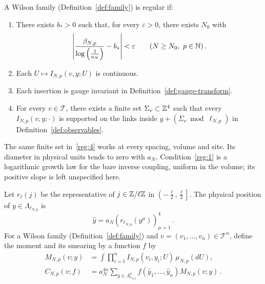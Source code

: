 \begin{definition}[Regularity]\label{def:regular}
A Wilson family (Definition~\ref{def:family}) is regular if:
\begin{enumerate}[label=\textup{Reg\arabic*.},ref=Reg\arabic*]
\item\label{reg:1} There exists $b_*>0$ such that, for every $\varepsilon>0$, there exists $N_0$ with
\begin{equation}\label{eq:running}
\left|\frac{\beta_{N,p}}{\log\left(\frac{1}{a_N}\right)}-b_*\right|<\varepsilon
\qquad(N\ge N_0,\ p\in\mathbb N)\,.
\end{equation}
\item\label{reg:2} Each $U\mapsto I_{N,p}(v,y;U)$ is continuous.
\item\label{reg:3} Each insertion is gauge invariant in Definition~\ref{def:gauge-transform}.
\item\label{reg:4} For every $v\in\mathcal T$, there exists a finite set $\Sigma_v\subset\mathbb Z^4$ such that every $I_{N,p}(v,y;\cdot)$ is supported on the links inside $y+(\Sigma_v\bmod\ell_{N,p})$ in Definition~\ref{def:observables}.
\end{enumerate}
\end{definition}

The same finite set in~\ref{reg:4} works at every spacing, volume and site.
Its diameter in physical units tends to zero with $a_N$.
Condition~\ref{reg:1} is a logarithmic growth law for the bare inverse coupling, uniform in the volume; its positive slope is left unspecified here.

\begin{definition}\label{def:moments}
Let $r_\ell(j)$ be the representative of $j\in\mathbb Z/\ell\mathbb Z$ in
$\left(-\frac{\ell}{2},\frac{\ell}{2}\right]$.
The physical position of $y\in\Lambda_{\ell_{N,p}}$ is
\begin{equation}\label{eq:physical-position}
\hat y=a_N(r_{\ell_{N,p}}(y^\mu))_{\mu=1}^4\,.
\end{equation}
For a Wilson family (Definition~\ref{def:family}) and $v=(v_1,\ldots,v_n)\in\mathcal T^n$, define the moment and its smearing by a function $f$ by
\begin{equation}\label{eq:smear}
\begin{aligned}
M_{N,p}(v;y)&=\int\prod_{i=1}^n I_{N,p}(v_i,y_i;U)\,\mu_{N,p}(dU),\\
C_{N,p}(v;f)&=a_N^{4n}\sum_{y\in\Lambda_{\ell_{N,p}}^n}
 f(\hat y_1,\ldots,\hat y_n)M_{N,p}(v;y)\,.
\end{aligned}
\end{equation}
\end{definition}

